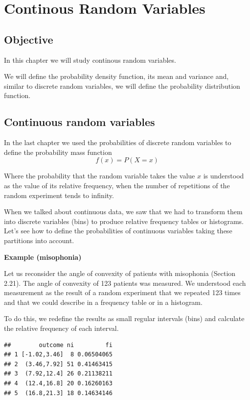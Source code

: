 \documentclass[
]{book}
\begin{document}
\hypertarget{continous-random-variables}{%
\chapter{Continous Random Variables}\label{continous-random-variables}}

\hypertarget{objective-1}{%
\section{Objective}\label{objective-1}}

In this chapter we will study continous random variables.

We will define the probability density function, its mean and variance and, similar to discrete random variables, we will define the probability distribution function.

\hypertarget{continuous-random-variables}{%
\section{Continuous random variables}\label{continuous-random-variables}}

In the last chapter we used the probabilities of discrete random variables to define the probability mass function \[f(x)=P(X= x)\]

Where the probability that the random variable takes the value \(x\) is understood as the value of its relative frequency, when the number of repetitions of the random experiment tends to infinity.

When we talked about continuous data, we saw that we had to transform them into discrete variables (bins) to produce relative frequency tables or histograms. Let's see how to define the probabilities of continuous variables taking these partitions into account.

\textbf{Example (misophonia)}

Let us reconsider the angle of convexity of patients with misophonia (Section 2.21). The angle of convexity of 123 patients was measured. We understood each measurement as the result of a random experiment that we repeated 123 times and that we could describe in a frequency table or in a histogram.

To do this, we redefine the results as small regular intervals (bins) and calculate the relative frequency of each interval.

\begin{verbatim}
##        outcome ni         fi
## 1 [-1.02,3.46]  8 0.06504065
## 2  (3.46,7.92] 51 0.41463415
## 3  (7.92,12.4] 26 0.21138211
## 4  (12.4,16.8] 20 0.16260163
## 5  (16.8,21.3] 18 0.14634146
\end{verbatim}
\end{document}
